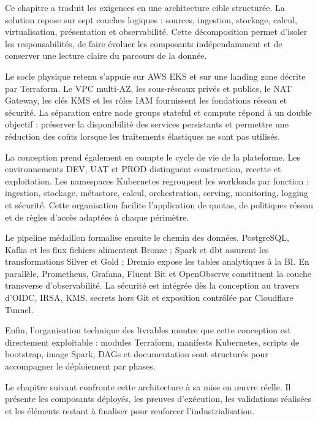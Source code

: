 Ce chapitre a traduit les exigences en une architecture cible structurée. La solution repose sur sept couches logiques : sources, ingestion, stockage, calcul, virtualisation, présentation et observabilité. Cette décomposition permet d'isoler les responsabilités, de faire évoluer les composants indépendamment et de conserver une lecture claire du parcours de la donnée.

Le socle physique retenu s'appuie sur AWS EKS et sur une landing zone décrite par Terraform. Le VPC multi-AZ, les sous-réseaux privés et publics, le NAT Gateway, les clés KMS et les rôles IAM fournissent les fondations réseau et sécurité. La séparation entre node groups stateful et compute répond à un double objectif : préserver la disponibilité des services persistants et permettre une réduction des coûts lorsque les traitements élastiques ne sont pas utilisés.

La conception prend également en compte le cycle de vie de la plateforme. Les environnements DEV, UAT et PROD distinguent construction, recette et exploitation. Les namespaces Kubernetes regroupent les workloads par fonction : ingestion, stockage, métastore, calcul, orchestration, serving, monitoring, logging et sécurité. Cette organisation facilite l'application de quotas, de politiques réseau et de règles d'accès adaptées à chaque périmètre.

Le pipeline médaillon formalise ensuite le chemin des données. PostgreSQL, Kafka et les flux fichiers alimentent Bronze ; Spark et dbt assurent les transformations Silver et Gold ; Dremio expose les tables analytiques à la BI. En parallèle, Prometheus, Grafana, Fluent Bit et OpenObserve constituent la couche transverse d'observabilité. La sécurité est intégrée dès la conception au travers d'OIDC, IRSA, KMS, secrets hors Git et exposition contrôlée par Cloudflare Tunnel.

Enfin, l'organisation technique des livrables montre que cette conception est directement exploitable : modules Terraform, manifests Kubernetes, scripts de bootstrap, image Spark, DAGs et documentation sont structurés pour accompagner le déploiement par phases.

Le chapitre suivant confronte cette architecture à sa mise en œuvre réelle. Il présente les composants déployés, les preuves d'exécution, les validations réalisées et les éléments restant à finaliser pour renforcer l'industrialisation.

\clearpage
